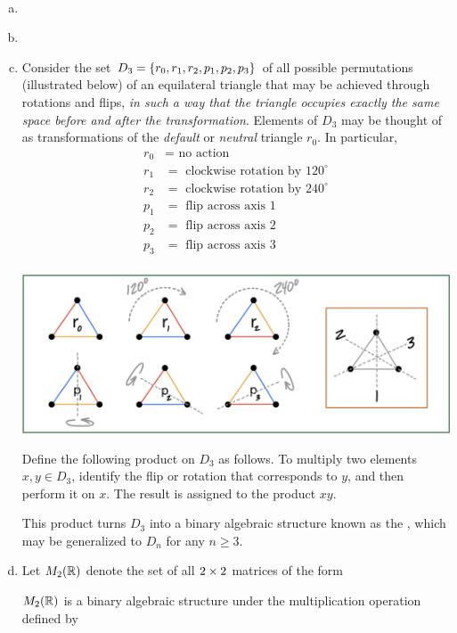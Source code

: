 \documentclass[11pt,fleqn,dvipsnames,usenames]{article}
\newcommand{\p}{\noindent}
\begin{document}
\begin{examples*}~
\begin{enumerate}[(a)]
\item ~
\vspace{3cm}

\item~
\vspace{3cm}

\item Consider the set $D_3 = \left\{r_0,r_1,r_2,p_1,p_2,p_3\right\}$ of all possible permutations (illustrated below) of an equilateral triangle that may be achieved through rotations and flips, \emph{in such a way that the triangle occupies exactly the same space before and after the transformation}.  Elements of $D_3$ may be thought of as transformations of the \emph{default} or \emph{neutral} triangle $r_{0}$.  In particular,
\begin{align*}
r_0 &= \text{ no action }\\
r_1 &= \text{ clockwise rotation by }120^{\circ}\\
r_2 &= \text{ clockwise rotation by }240^{\circ}\\
p_1 &= \text{ flip across axis }1\\
p_2 &= \text{ flip across axis }2\\
p_3 &= \text{ flip across axis }3\\
\end{align*}
\begin{center}
\includegraphics[width=1\linewidth]{permutationsoftriangle}
\end{center}

Define the following product on $D_{3}$ as follows.  To multiply two elements $x,y\in D_3$, identify the flip or rotation that corresponds to $y$, and then perform it on $x$.  The result is assigned to the \nolinebreak product \nolinebreak $xy$.
\vspace{10cm}

\p This product turns $D_{3}$ into a binary algebraic structure known as the , which may be generalized to $D_n$ for any $n\geq 3$.
\vsp

\item Let $M_{2}(\mathbb{R})$ denote the set of all $2\times 2$ matrices of the form
\vspace{2cm}

$M_{2}(\mathbb{R})$ is a binary algebraic structure under the multiplication operation defined by
\vspace{4cm}

\end{enumerate}

\end{examples*}
\end{document}
